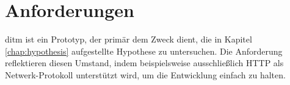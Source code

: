 \documentclass[12pt,a4paper]{report}
\begin{document}

\section{Anforderungen}
ditm ist ein Prototyp, der primär dem Zweck dient, die in Kapitel \ref{chap:hypothesis} aufgestellte Hypothese zu untersuchen.
Die Anforderung reflektieren diesen Umstand, indem beispielsweise ausschließlich HTTP als Netwerk-Protokoll unterstützt wird,
um die Entwicklung einfach zu halten.
\end{document}
